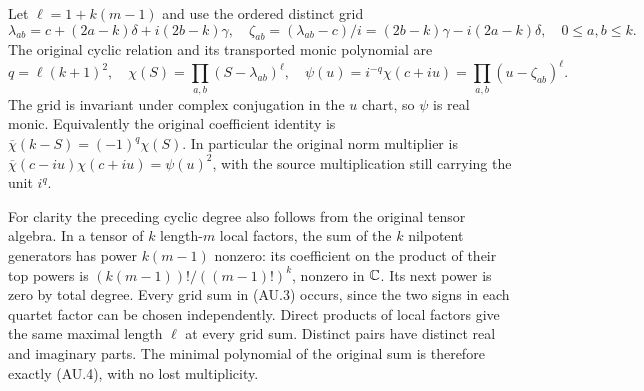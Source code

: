 Let $\ell=1+k(m-1)$ and use the ordered distinct grid
\[
 \lambda_{ab}=c+(2a-k)\delta+i(2b-k)\gamma,
 \quad \zeta_{ab}=(\lambda_{ab}-c)/i
     =(2b-k)\gamma-i(2a-k)\delta,
 \quad 0\le a,b\le k.                                      \tag{AU.3}
\]
The original cyclic relation and its transported monic polynomial are
\[
 q=\ell(k+1)^2,\quad
 \chi(S)=\prod_{a,b}(S-\lambda_{ab})^\ell,\quad
 \psi(u)=i^{-q}\chi(c+iu)=\prod_{a,b}(u-\zeta_{ab})^\ell.
 \tag{AU.4}
\]
The grid is invariant under complex conjugation in the $u$ chart, so
$\psi$ is real monic. Equivalently the original coefficient identity is
$\overline\chi(k-S)=(-1)^q\chi(S)$. In particular the original norm
multiplier is $\overline\chi(c-iu)\chi(c+iu)=\psi(u)^2$, with the
source multiplication still carrying the unit $i^q$.

For clarity the preceding cyclic degree also follows from the original
tensor algebra. In a tensor of $k$ length-$m$ local factors, the sum of
the $k$ nilpotent generators has power $k(m-1)$ nonzero: its coefficient
on the product of their top powers is $(k(m-1))!/((m-1)!)^k$, nonzero
in $\mathbb{C}$. Its next power is zero by total degree. Every grid sum in
(AU.3) occurs, since the two signs in each quartet factor can be chosen
independently. Direct products of local factors give the same maximal
length $\ell$ at every grid sum. Distinct pairs have distinct real and
imaginary parts. The minimal polynomial of the original sum is
therefore exactly (AU.4), with no lost multiplicity.

